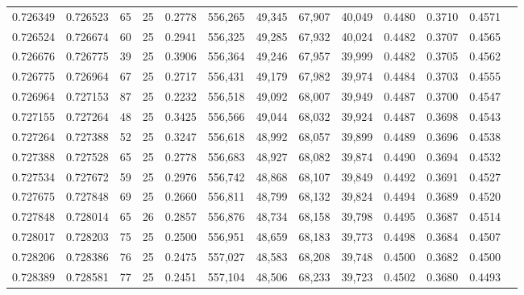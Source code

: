 \begin{tabular}{rrrrrrrrrrrrr}
0.726349 & 0.726523 &    65 &  25 &                                     0.2778 & 556,265 &  49,345 &  67,907 &  40,049 & 0.4480 & 0.3710 & 0.4571 \\
0.726524 & 0.726674 &    60 &  25 &                                     0.2941 & 556,325 &  49,285 &  67,932 &  40,024 & 0.4482 & 0.3707 & 0.4565 \\
0.726676 & 0.726775 &    39 &  25 &                                     0.3906 & 556,364 &  49,246 &  67,957 &  39,999 & 0.4482 & 0.3705 & 0.4562 \\
0.726775 & 0.726964 &    67 &  25 &                                     0.2717 & 556,431 &  49,179 &  67,982 &  39,974 & 0.4484 & 0.3703 & 0.4555 \\
0.726964 & 0.727153 &    87 &  25 &                                     0.2232 & 556,518 &  49,092 &  68,007 &  39,949 & 0.4487 & 0.3700 & 0.4547 \\
0.727155 & 0.727264 &    48 &  25 &                                     0.3425 & 556,566 &  49,044 &  68,032 &  39,924 & 0.4487 & 0.3698 & 0.4543 \\
0.727264 & 0.727388 &    52 &  25 &                                     0.3247 & 556,618 &  48,992 &  68,057 &  39,899 & 0.4489 & 0.3696 & 0.4538 \\
0.727388 & 0.727528 &    65 &  25 &                                     0.2778 & 556,683 &  48,927 &  68,082 &  39,874 & 0.4490 & 0.3694 & 0.4532 \\
0.727534 & 0.727672 &    59 &  25 &                                     0.2976 & 556,742 &  48,868 &  68,107 &  39,849 & 0.4492 & 0.3691 & 0.4527 \\
0.727675 & 0.727848 &    69 &  25 &                                     0.2660 & 556,811 &  48,799 &  68,132 &  39,824 & 0.4494 & 0.3689 & 0.4520 \\
0.727848 & 0.728014 &    65 &  26 &                                     0.2857 & 556,876 &  48,734 &  68,158 &  39,798 & 0.4495 & 0.3687 & 0.4514 \\
0.728017 & 0.728203 &    75 &  25 &                                     0.2500 & 556,951 &  48,659 &  68,183 &  39,773 & 0.4498 & 0.3684 & 0.4507 \\
0.728206 & 0.728386 &    76 &  25 &                                     0.2475 & 557,027 &  48,583 &  68,208 &  39,748 & 0.4500 & 0.3682 & 0.4500 \\
0.728389 & 0.728581 &    77 &  25 &                                     0.2451 & 557,104 &  48,506 &  68,233 &  39,723 & 0.4502 & 0.3680 & 0.4493 \\

\end{tabular}
